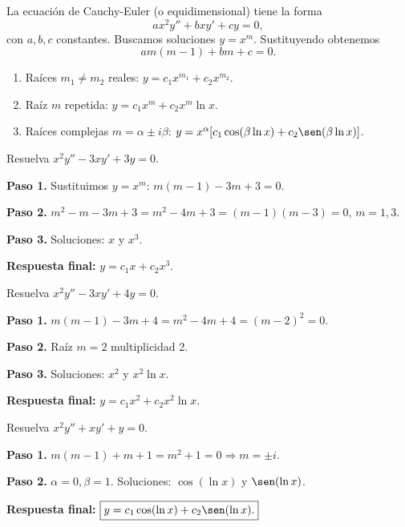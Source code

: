 La ecuación de Cauchy-Euler (o equidimensional) tiene la forma
\[
a x^2 y'' + b x y' + c y = 0,
\]
con $a,b,c$ constantes. Buscamos soluciones $y = x^m$. Sustituyendo obtenemos
\[
a m(m-1) + b m + c = 0.
\]

\begin{theorem}[Casos]
\begin{enumerate}
\item Raíces $m_1 \neq m_2$ reales: $y = c_1 x^{m_1} + c_2 x^{m_2}$.
\item Raíz $m$ repetida: $y = c_1 x^m + c_2 x^m \ln x$.
\item Raíces complejas $m = \alpha \pm i\beta$: $y = x^\alpha [c_1 \cos(\beta \ln x) + c_2 \sen(\beta \ln x)]$.
\end{enumerate}
\end{theorem}

\begin{example}
Resuelva $x^2 y'' - 3x y' + 3y = 0$.

\begin{myproof}
\textbf{Paso 1.} Sustituimos $y=x^m$: $m(m-1) - 3m + 3 = 0$.

\textbf{Paso 2.} $m^2 - m - 3m + 3 = m^2 - 4m + 3 = (m-1)(m-3)=0$, $m=1,3$.

\textbf{Paso 3.} Soluciones: $x$ y $x^3$.

\textbf{Respuesta final:} $\boxed{y = c_1 x + c_2 x^3.}$
\end{myproof}
\end{example}

\begin{example}
Resuelva $x^2 y'' - 3x y' + 4y = 0$.

\begin{myproof}
\textbf{Paso 1.} $m(m-1) - 3m + 4 = m^2 -4m + 4 = (m-2)^2=0$.

\textbf{Paso 2.} Raíz $m=2$ multiplicidad 2.

\textbf{Paso 3.} Soluciones: $x^2$ y $x^2 \ln x$.

\textbf{Respuesta final:} $\boxed{y = c_1 x^2 + c_2 x^2 \ln x.}$
\end{myproof}
\end{example}

\begin{example}
Resuelva $x^2 y'' + x y' + y = 0$.

\begin{myproof}
\textbf{Paso 1.} $m(m-1) + m + 1 = m^2 + 1 = 0 \Rightarrow m = \pm i$.

\textbf{Paso 2.} $\alpha=0, \beta=1$. Soluciones: $\cos(\ln x)$ y $\sen(\ln x)$.

\textbf{Respuesta final:} $\boxed{y = c_1 \cos(\ln x) + c_2 \sen(\ln x).}$
\end{myproof}
\end{example}

